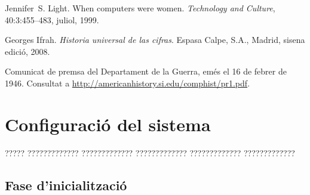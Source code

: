\documentclass[11pt,catalan,listoffigures,listoftables]{tfgetsinf}
\begin{document}
\begin{thebibliography}{10}
   Jennifer~S. Light.
   \newblock When computers were women.
   \newblock \textit{Technology and Culture}, 40:3:455--483, juliol, 1999.

   Georges Ifrah.
   \newblock \textit{Historia universal de las cifras}.
   \newblock Espasa Calpe, S.A., Madrid, sisena edició, 2008.

   Comunicat de premsa del Departament de la Guerra, 
   emés el 16 de febrer de 1946. 
   \newblock Consultat a 
   \url{http://americanhistory.si.edu/comphist/pr1.pdf}.

\end{thebibliography}
\cleardoublepage


\APPENDIX


\chapter{Configuració del sistema}

????? ????????????? ????????????? ????????????? ????????????? ?????????????

\section{Fase d'inicialització}
\end{document}
